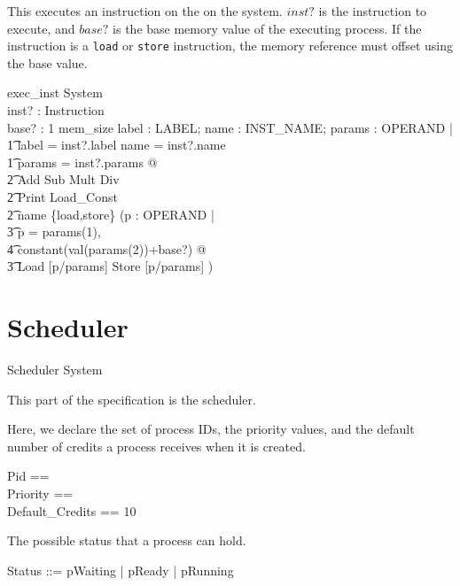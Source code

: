 \documentclass{article}
\begin{document}
This executes an instruction on the on the system. $inst?$ is the
instruction to execute, and $base?$ is the base memory value of the
executing process. If the instruction is a {\tt load} or {\tt store}
instruction, the memory reference must offset using the base value.

\begin{schema}{exec\_inst}
  \Delta System\\
  inst? : Instruction\\
  base? : 1 \upto mem\_size
\where
  \exists label : \power LABEL; name : INST\_NAME; params : \seq OPERAND |\\
    \t1 label = inst?.label \land name = inst?.name \land \\
    \t1 params = inst?.params @\\
      \t2 Add \lor Sub \lor Mult \lor Div \lor\\
      \t2 Print \lor Load\_Const \lor\\
      \t2 name \in \{load,store\} \implies (\exists p : \seq OPERAND |\\
        \t3 p = \langle params(1), \\
          \t4 constant(val(params(2))+base?) \rangle @\\
        \t3 Load [p/params] \lor Store [p/params] )
\end{schema}

\ZDeclSummary

\section{Scheduler}

\begin{zsection}
  \SECTION Scheduler \parents System
\end{zsection}

This part of the specification is the scheduler.

Here, we declare the set of process IDs, the priority values, and the
default number of credits a process receives when it is created.

\begin{zed}
  Pid == \nat\\
  Priority ==  \\
  Default\_Credits == 10
\end{zed}

The possible status that a process can hold.

\begin{zed}
  Status ::= pWaiting | pReady | pRunning
\end{zed}
\end{document}
